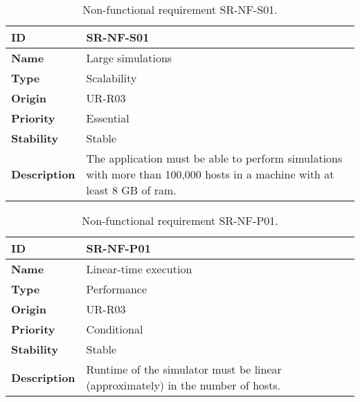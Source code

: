 \begin{center}
\begin{table*}[htbp]
\centering
\begin{tabular}{@{}p{2.5cm} p{9cm}@{}} 
\toprule
\textbf{ID} 				& SR-NF-S01\\
\midrule
\textbf{Name} 			& Large simulations \\
\midrule
\textbf{Type} 			& Scalability \\
\midrule
\textbf{Origin} 			& UR-R03 \\
\midrule
\textbf{Priority}		& Essential \\
\midrule
\textbf{Stability} 		& Stable \\
\midrule
\textbf{Description} 	& The application must be able to perform simulations with more than 100,000 hosts in a machine with at least 8 GB of \gls{ram}. \\
\bottomrule
\end{tabular}
\caption{Non-functional requirement SR-NF-S01.}
\label{tab:srnfs01}
\end{table*}
\end{center}

\begin{center}
\begin{table*}[htbp]
\centering
\begin{tabular}{@{}p{2.5cm} p{9cm}@{}} 
\toprule
\textbf{ID} 				& SR-NF-P01\\
\midrule
\textbf{Name} 			& Linear-time execution \\
\midrule
\textbf{Type} 			& Performance \\
\midrule
\textbf{Origin} 			& UR-R03 \\
\midrule
\textbf{Priority}		& Conditional \\
\midrule
\textbf{Stability} 		& Stable \\
\midrule
\textbf{Description} 	& Runtime of the simulator must be linear (approximately) in the number of hosts. \\
\bottomrule
\end{tabular}
\caption{Non-functional requirement SR-NF-P01.}
\label{tab:srnfp01}
\end{table*}
\end{center}

